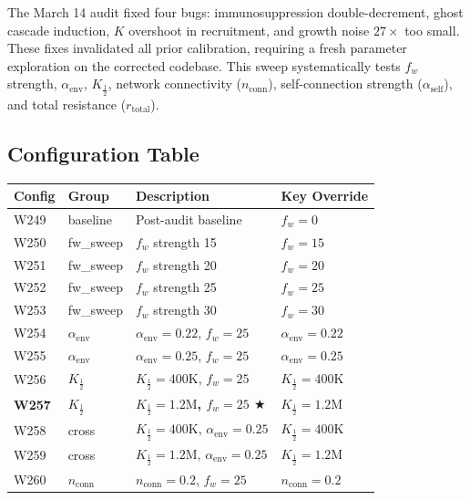 \documentclass[11pt,a4paper,oneside]{article}
\begin{document}
The March 14 audit fixed four bugs: immunosuppression double-decrement, ghost cascade induction, $K$ overshoot in recruitment, and growth noise $27\times$ too small. These fixes invalidated all prior calibration, requiring a fresh parameter exploration on the corrected codebase. This sweep systematically tests $f_w$ strength, $\alpha_{\text{env}}$, $K_{\frac{1}{2}}$, network connectivity ($n_{\text{conn}}$), self-connection strength ($\alpha_{\text{self}}$), and total resistance ($r_{\text{total}}$).

\subsection{Configuration Table}

\begin{table}[H]
\centering
\small
\begin{tabular}{llll}
\toprule
\textbf{Config} & \textbf{Group} & \textbf{Description} & \textbf{Key Override} \\
\midrule
W249 & baseline & Post-audit baseline & $f_w = 0$ \\
\rowcolor{lightgray}
W250 & fw\_sweep & $f_w$ strength 15 & $f_w = 15$ \\
W251 & fw\_sweep & $f_w$ strength 20 & $f_w = 20$ \\
\rowcolor{lightgray}
W252 & fw\_sweep & $f_w$ strength 25 & $f_w = 25$ \\
W253 & fw\_sweep & $f_w$ strength 30 & $f_w = 30$ \\
\rowcolor{lightgray}
W254 & $\alpha_{\text{env}}$ & $\alpha_{\text{env}} = 0.22$, $f_w = 25$ & $\alpha_{\text{env}} = 0.22$ \\
W255 & $\alpha_{\text{env}}$ & $\alpha_{\text{env}} = 0.25$, $f_w = 25$ & $\alpha_{\text{env}} = 0.25$ \\
\rowcolor{lightgray}
W256 & $K_{\frac{1}{2}}$ & $K_{\frac{1}{2}} = 400\text{K}$, $f_w = 25$ & $K_{\frac{1}{2}} = 400\text{K}$ \\
\textbf{W257} & \textbf{$K_{\frac{1}{2}}$} & \textbf{$K_{\frac{1}{2}} = 1.2\text{M}$, $f_w = 25$ $\bigstar$} & \textbf{$K_{\frac{1}{2}} = 1.2\text{M}$} \\
\rowcolor{lightgray}
W258 & cross & $K_{\frac{1}{2}} = 400\text{K}$, $\alpha_{\text{env}} = 0.25$ & $K_{\frac{1}{2}} = 400\text{K}$ \\
W259 & cross & $K_{\frac{1}{2}} = 1.2\text{M}$, $\alpha_{\text{env}} = 0.25$ & $K_{\frac{1}{2}} = 1.2\text{M}$ \\
\rowcolor{lightgray}
W260 & $n_{\text{conn}}$ & $n_{\text{conn}} = 0.2$, $f_w = 25$ & $n_{\text{conn}} = 0.2$ \\

\end{tabular}
\end{table}
\end{document}
